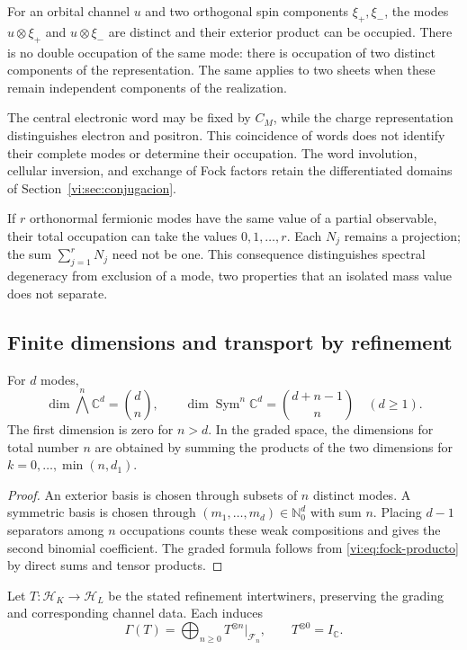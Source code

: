 For an orbital channel \(u\) and two orthogonal spin components
\(\xi_+,\xi_-\), the modes \(u\otimes\xi_+\) and
\(u\otimes\xi_-\) are distinct and their exterior product can be
occupied. There is no double occupation of the same mode: there is
occupation of two distinct components of the representation.
The same applies to two sheets when these remain independent components
of the realization.

The central electronic word may be fixed by \(C_M\), while the
charge representation distinguishes electron and positron.
This coincidence of words does not identify their complete modes or
determine their occupation. The word involution, cellular inversion,
and exchange of Fock factors retain the differentiated domains of
Section~\ref{vi:sec:conjugacion}.

If \(r\) orthonormal fermionic modes have the same value of a
partial observable, their total occupation can take the values
\(0,1,\ldots,r\). Each \(N_j\) remains a projection;
the sum \(\sum_{j=1}^rN_j\) need not be one.
This consequence distinguishes spectral degeneracy from exclusion
of a mode, two properties that an isolated mass value does not separate.

\subsection{Finite dimensions and transport by refinement}
\label{vi:subsec:fock-refinamiento}

\begin{proposition}
\label{vi:prop:censo-fock}
For \(d\) modes,
\[
 \dim\bigwedge^n\mathbb C^d=\binom dn,
 \qquad
 \dim\operatorname{Sym}^n\mathbb C^d=\binom{d+n-1}{n}
 \quad(d\ge1).
\]
The first dimension is zero for \(n>d\). In the graded space,
the dimensions for total number \(n\) are obtained by summing
the products of the two dimensions for
\(k=0,\ldots,\min(n,d_1)\).
\end{proposition}
\begin{proof}
An exterior basis is chosen through subsets of \(n\) distinct modes.
A symmetric basis is chosen through
\((m_1,\ldots,m_d)\in\mathbb N_0^d\) with sum \(n\).
Placing \(d-1\) separators among \(n\) occupations counts
these weak compositions and gives the second binomial coefficient.
The graded formula follows from \eqref{vi:eq:fock-producto} by
direct sums and tensor products.
\end{proof}

Let \(T:\mathcal H_K\to\mathcal H_L\) be the stated refinement
intertwiners, preserving the grading and corresponding channel data.
Each induces
\begin{equation}
 \Gamma(T)=\bigoplus_{n\ge0}T^{\otimes n}|_{\mathcal F_n},
 \qquad T^{\otimes0}=I_{\mathbb C}.
 \label{vi:eq:segunda-cuantizacion-transporte}
\end{equation}

